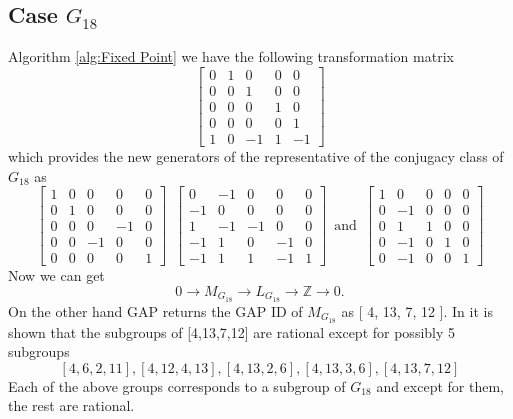 \documentclass{article}
\theoremstyle{plain}
\theoremstyle{definition}
\newcommand{\Z}{\ensuremath{\mathbb{Z}}}
\newcommand{\tand}{\ensuremath{\,\,\, \text{and} \,\,\,}}
\newcommand{\exactseq}[1]{\ensuremath{0 \longrightarrow M_{#1} \longrightarrow L_{#1} \longrightarrow \Z \longrightarrow 0}}
\begin{document}
\subsection{Case $G_{18}$}
Algorithm \ref{alg:Fixed Point} we have the following transformation matrix 
$$
 \left[ \begin {array}{ccccc} 0&1&0&0&0\\ 0&0&1&0&0
\\ 0&0&0&1&0\\ 0&0&0&0&1
\\ 1&0&-1&1&-1\end {array} \right]
$$
which provides the new generators of the representative of the conjugacy class of $G_{18}$ as
$$
\left[ \begin {array}{cccc|c} 1&0&0&0&0\\  0&1&0&0&0
\\  0&0&0&-1&0\\  0&0&-1&0&0
\\ \hline 0&0&0&0&1\end {array} \right] 
\,\,\,
 \left[ \begin {array}{cccc|c} 0&-1&0&0&0\\  -1&0&0&0&0
\\  1&-1&-1&0&0\\  -1&1&0&-1&0
\\ \hline -1&1&1&-1&1\end {array} \right] 
\tand
 \left[ \begin {array}{cccc|c} 1&0&0&0&0\\  0&-1&0&0&0
\\  0&1&1&0&0\\  0&-1&0&1&0
\\ \hline 0&-1&0&0&1\end {array} \right] 
$$
Now we can get 
$$\exactseq{G_{18}}.$$
On the other hand GAP returns the GAP ID of $M_{G_{18}}$  as [ 4, 13, 7, 12 ].
In \cite{Nicole1} it is shown that the subgroups of [4,13,7,12] are rational except for possibly 5 subgroups $$[4, 6, 2, 11], [4, 12, 4, 13], [4, 13, 2, 6], [4, 13, 3, 6], [4, 13, 7, 12]$$
Each of the above groups corresponds to a subgroup of $G_{18}$ and except for them, the rest are rational.
\end{document}
